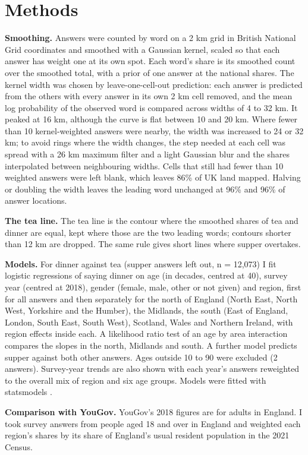 \documentclass[11pt,a4paper]{article}
\begin{document}
\section{Methods}
\textbf{Smoothing.} Answers were counted by word on a 2 km grid in British National Grid coordinates and smoothed with a Gaussian kernel, scaled so that each answer has weight one at its own spot. Each word's share is its smoothed count over the smoothed total, with a prior of one answer at the national shares. The kernel width was chosen by leave-one-cell-out prediction: each answer is predicted from the others with every answer in its own 2 km cell removed, and the mean log probability of the observed word is compared across widths of 4 to 32 km. It peaked at 16 km, although the curve is flat between 10 and 20 km. Where fewer than 10 kernel-weighted answers were nearby, the width was increased to 24 or 32 km; to avoid rings where the width changes, the step needed at each cell was spread with a 26 km maximum filter and a light Gaussian blur and the shares interpolated between neighbouring widths. Cells that still had fewer than 10 weighted answers were left blank, which leaves 86\% of UK land mapped. Halving or doubling the width leaves the leading word unchanged at 96\% and 96\% of answer locations.

\textbf{The tea line.} The tea line is the contour where the smoothed shares of tea and dinner are equal, kept where those are the two leading words; contours shorter than 12 km are dropped. The same rule gives short lines where supper overtakes.

\textbf{Models.} For dinner against tea (supper answers left out, n = 12,073) I fit logistic regressions of saying dinner on age (in decades, centred at 40), survey year (centred at 2018), gender (female, male, other or not given) and region, first for all answers and then separately for the north of England (North East, North West, Yorkshire and the Humber), the Midlands, the south (East of England, London, South East, South West), Scotland, Wales and Northern Ireland, with region effects inside each. A likelihood ratio test of an age by area interaction compares the slopes in the north, Midlands and south. A further model predicts supper against both other answers. Ages outside 10 to 90 were excluded (2 answers). Survey-year trends are also shown with each year's answers reweighted to the overall mix of region and six age groups. Models were fitted with statsmodels \citep{statsmodels}.

\textbf{Comparison with YouGov.} YouGov's 2018 figures are for adults in England. I took survey answers from people aged 18 and over in England and weighted each region's shares by its share of England's usual resident population in the 2021 Census.
\end{document}
